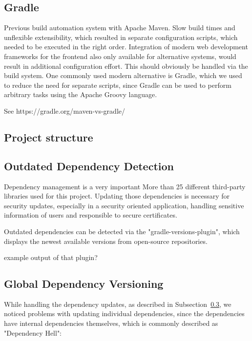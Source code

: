 \subsection{Gradle}\label{subsec:gradle}

Previous build automation system with Apache Maven.
Slow build times and unflexible extensibility, which resulted in separate configuration scripts, which needed to be
executed in the right order.
Integration of modern web development frameworks for the frontend also only available for alternative systems, would
result in additional configuration effort.
This should obviously be handled via the build system.
One commonly used modern alternative is Gradle, which we used to reduce the need for separate scripts, since Gradle can
be used to perform arbitrary tasks using the Apache Groovy language.

See https://gradle.org/maven-vs-gradle/
\subsection{Project structure}\label{subsec:projectStructure}
\subsection{Outdated Dependency Detection}\label{subsec:outdatedDependencyDetection}
Dependency management is a very important
More than 25 different third-party libraries used for this project.
Updating those dependencies is necessary for security updates, especially in a security oriented application, handling
sensitive information of users and responsible to secure certificates.

Outdated dependencies can be detected via the "gradle-versions-plugin", which displays the newest available versions
from open-source repositories.

example output of that plugin?

\subsection{Global Dependency Versioning}\label{subsec:globalDependencyVersioning}
While handling the dependency updates, as described in Subsection~\ref{subsec:outdatedDependencyDetection}, we noticed
problems with updating individual dependencies, since the dependencies have internal dependencies themselves, which is
commonly described as "Dependency Hell": %

